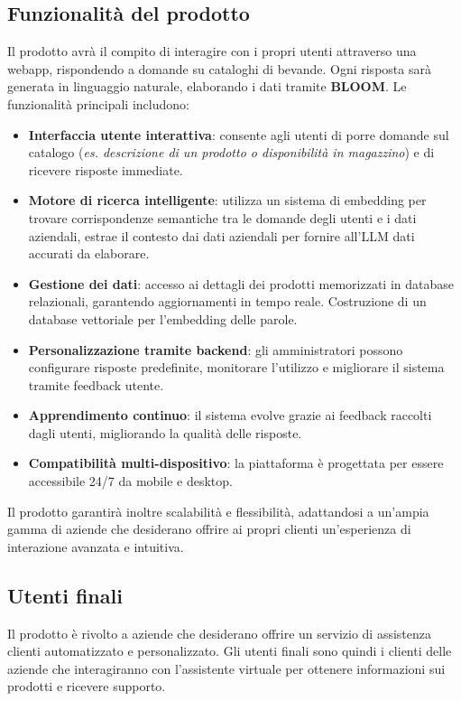 \subsection{Funzionalità del prodotto}
Il prodotto avrà il compito di interagire con i propri utenti attraverso una webapp, rispondendo a domande su cataloghi di bevande. Ogni risposta sarà generata in linguaggio naturale, elaborando i dati tramite \textbf{BLOOM}. Le funzionalità principali includono:
\begin{itemize}
    \item \textbf{Interfaccia utente interattiva}: consente agli utenti di porre domande sul catalogo (\textit{es. descrizione di un prodotto o disponibilità in magazzino}) e di ricevere risposte immediate.
    \item \textbf{Motore di ricerca intelligente}: utilizza un sistema di embedding per trovare corrispondenze semantiche tra le domande degli utenti e i dati aziendali, estrae il contesto dai dati aziendali per fornire all'LLM dati accurati da elaborare.
    \item \textbf{Gestione dei dati}: accesso ai dettagli dei prodotti memorizzati in database relazionali, garantendo aggiornamenti in tempo reale. Costruzione di un database vettoriale per l'embedding delle parole.
    \item \textbf{Personalizzazione tramite backend}: gli amministratori possono configurare risposte predefinite, monitorare l’utilizzo e migliorare il sistema tramite feedback utente.
    \item \textbf{Apprendimento continuo}: il sistema evolve grazie ai feedback raccolti dagli utenti, migliorando la qualità delle risposte.
    \item \textbf{Compatibilità multi-dispositivo}: la piattaforma è progettata per essere accessibile 24/7 da mobile e desktop.
\end{itemize}

Il prodotto garantirà inoltre scalabilità e flessibilità, adattandosi a un’ampia gamma di aziende che desiderano offrire ai propri clienti un’esperienza di interazione avanzata e intuitiva.

\subsection{Utenti finali}
Il prodotto è rivolto a aziende che desiderano offrire un servizio di assistenza 
clienti automatizzato e personalizzato. Gli utenti finali sono quindi i clienti 
delle aziende che interagiranno con l’assistente virtuale per ottenere 
informazioni sui prodotti e ricevere supporto.